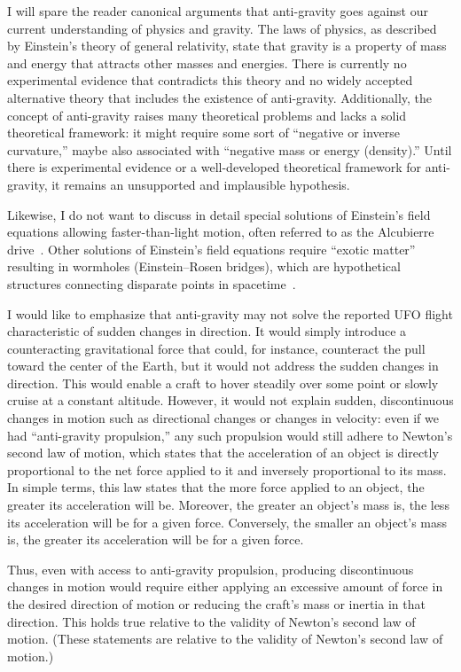 I will spare the reader canonical arguments that
anti-gravity goes against our current understanding of physics and gravity.
The laws of physics, as described by Einstein's theory of general relativity,
state that gravity is a property of mass and energy that attracts other masses and energies.
There is currently no experimental evidence that contradicts this theory and no widely accepted alternative
theory that includes the existence of anti-gravity.
Additionally, the concept of anti-gravity raises many theoretical problems and lacks a solid theoretical framework:
it might require some sort of ``negative or inverse curvature,''
maybe also associated with ``negative mass or energy (density).''
Until there is experimental evidence or a well-developed theoretical framework for anti-gravity,
it remains an unsupported and implausible hypothesis.

Likewise, I do not want to discuss in detail special solutions of Einstein's field equations
allowing faster-than-light motion,
often referred to as the Alcubierre drive~\cite{0264-9381-11-5-001,Lentz2021,Fell_2021}.
Other solutions of Einstein's field equations require ``exotic matter'' resulting in
wormholes (Einstein--Rosen bridges), which are hypothetical structures connecting disparate points in spacetime~\cite{Misner-Wheeler-Thorne}.


I would like to emphasize that anti-gravity may not solve the reported UFO flight characteristic of sudden changes in direction.
It would simply introduce a counteracting gravitational force that could, for instance, counteract the pull toward the center of the Earth,
but it would not address the sudden changes in direction.
This would enable a craft to hover steadily over some point or slowly cruise at a constant altitude.
However, it would not explain sudden, discontinuous changes in motion such as directional changes or changes in velocity:
even if we had ``anti-gravity propulsion,'' any such propulsion would still adhere to Newton's second law of motion,
which states that the acceleration of an object is directly proportional to the net force applied to it and inversely proportional to its mass.
In simple terms, this law states that the more force applied to an object, the greater its acceleration will be.
Moreover, the greater an object's mass is, the less its acceleration will be for a given force.
Conversely, the smaller an object's mass is, the greater its acceleration will be for a given force.

Thus, even with access to anti-gravity propulsion, producing discontinuous changes in motion would require either applying an excessive amount of force in the
desired direction of motion or reducing the craft's mass or inertia in that direction.
This holds true relative to the validity of Newton's second law of motion.
(These statements are relative to the validity of Newton's second law of motion.)

